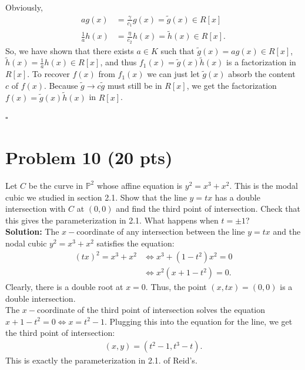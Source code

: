 \documentclass[12pt]{article}
\newcommand{\nn}{\nonumber}
\newcommand{\f}[2]{\frac{#1}{#2}}
\begin{document}
Obviously, 
\begin{align*}
ag(x) &= \f{\gamma}{c_1}g(x) = \tilde{g}(x) \in R[x]\nn\\
\f{1}{a}h(x) &= \f{\eta}{c_2}h(x) = \tilde{h}(x) \in R[x].
\end{align*}
So, we have shown that there exists $a \in K$ such that $\tilde{g}(x) = ag(x) \in R[x]$, $\tilde{h}(x) = \f{1}{a}h(x) \in R[x]$, and thus $f_1(x) = \tilde{g}(x)\tilde{h}(x)$ is a factorization in $R[x]$. To recover $f(x)$ from $f_1(x)$ we can just let $\tilde{g}(x)$ absorb the content $c$ of $f(x)$. Because $\tilde{g} \to c\tilde{g}$ must still be in $R[x]$, we get the factorization $f(x) = \tilde{g}(x)\tilde{h}(x)$ in $R[x]$.   

\hfill$\square$ 




















\newpage


\section*{Problem 10 \small{(20 pts)}}

Let $C$ be the curve in $\mathbb{P}^2$ whose affine equation is $y^2 = x^3 + x^2$. This is the modal cubic we studied in section 2.1. Show that the line $y=tx$ has a double intersection with $C$ at $(0,0)$ and find the third point of intersection. Check that this gives the parameterization in 2.1. What happens when $t = \pm 1$? \\



\noindent \textbf{Solution:} The $x-$coordinate of any intersection between the line $y = tx$ and the nodal cubic $y^2 = x^3 + x^2$ satisfies the equation:
\begin{align*}
(tx)^2 = x^3 + x^2 &\iff x^3 + (1-t^2)x^2 = 0 \nn\\
&\iff x^2(x + 1 -t^2) = 0.
\end{align*}
Clearly, there is a double root at $x=0$. Thus, the point $(x,tx) = (0,0)$ is a double intersection. \\

\noindent The $x-$coordinate of the third point of intersection solves the equation $x + 1 - t^2 = 0 \iff x = t^2 - 1$. Plugging this into the equation for the line, we get the third point of intersection:
\begin{align}
(x,y) = (t^2 - 1, t^3 - t).
\end{align}
This is exactly the parameterization in 2.1. of Reid's.\\
\end{document}
